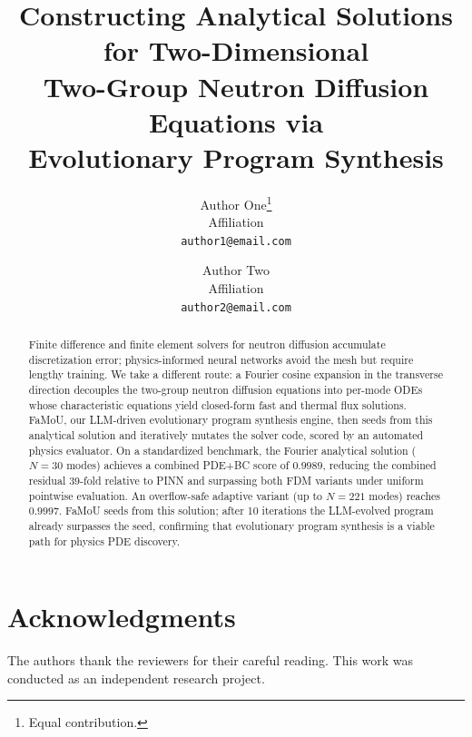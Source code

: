 \documentclass{article}
\title{Constructing Analytical Solutions for Two-Dimensional\\
Two-Group Neutron Diffusion Equations via\\
Evolutionary Program Synthesis}
\author{
  Author One\thanks{Equal contribution.} \\
  Affiliation \\
  \texttt{author1@email.com} \\
  \and
  Author Two\footnotemark[1] \\
  Affiliation \\
  \texttt{author2@email.com} \\
}
\date{}
\begin{document}
\maketitle

\begin{abstract}
Finite difference and finite element solvers for neutron diffusion accumulate discretization error; physics-informed neural networks avoid the mesh but require lengthy training.
%
We take a different route: a Fourier cosine expansion in the transverse direction decouples the two-group neutron diffusion equations into per-mode ODEs whose characteristic equations yield closed-form fast and thermal flux solutions.
%
FaMoU, our LLM-driven evolutionary program synthesis engine, then seeds from this analytical solution and iteratively mutates the solver code, scored by an automated physics evaluator.
%
On a standardized benchmark, the Fourier analytical solution ($N{=}30$ modes) achieves a combined PDE+BC score of $0.9989$, reducing the combined residual 39-fold relative to PINN and surpassing both FDM variants under uniform pointwise evaluation.
An overflow-safe adaptive variant (up to $N{=}221$ modes) reaches $0.9997$.
FaMoU seeds from this solution; after 10 iterations the LLM-evolved program already surpasses the seed, confirming that evolutionary program synthesis is a viable path for physics PDE discovery.
\end{abstract}








\section*{Acknowledgments}
The authors thank the reviewers for their careful reading. This work was conducted as an independent research project.




% 
\end{document}
